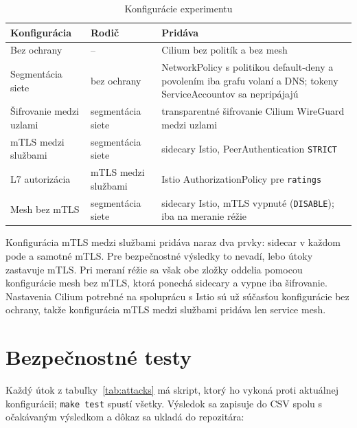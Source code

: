 \begin{table}[ht!]
  \centering
  \caption{Konfigurácie experimentu}
  \label{tab:configurations}
  \footnotesize
  \renewcommand{\arraystretch}{1.15}
  \begin{tabularx}{\textwidth}{@{}>{\raggedright\arraybackslash}p{3.2cm}>{\raggedright\arraybackslash}p{2.6cm}>{\raggedright\arraybackslash}X@{}}
    \toprule
    Konfigurácia & Rodič & Pridáva \\
    \midrule
    Bez ochrany & -- & Cilium bez politík a bez mesh \\
    Segmentácia siete & bez ochrany & NetworkPolicy s politikou default-deny a povolením iba grafu volaní a DNS; tokeny ServiceAccountov sa nepripájajú \\
    Šifrovanie medzi uzlami & segmentácia siete & transparentné šifrovanie Cilium WireGuard medzi uzlami \\
    mTLS medzi službami & segmentácia siete & sidecary Istio, PeerAuthentication \texttt{STRICT} \\
    L7 autorizácia & mTLS medzi službami & Istio AuthorizationPolicy pre \texttt{ratings} \\
    Mesh bez mTLS & segmentácia siete & sidecary Istio, mTLS vypnuté (\texttt{DISABLE}); iba na meranie réžie \\
    \bottomrule
  \end{tabularx}
\end{table}

Konfigurácia mTLS medzi službami pridáva naraz dva prvky: sidecar v každom pode a samotné mTLS. Pre bezpečnostné výsledky to nevadí, lebo útoky zastavuje mTLS. Pri meraní réžie sa však obe zložky oddelia pomocou konfigurácie mesh bez mTLS, ktorá ponechá sidecary a vypne iba šifrovanie. Nastavenia Cilium potrebné na spoluprácu s Istio sú už súčasťou konfigurácie bez ochrany, takže konfigurácia mTLS medzi službami pridáva len service mesh.

\section{Bezpečnostné testy}
\label{sec:attack-tests}

Každý útok z tabuľky~\ref{tab:attacks} má skript, ktorý ho vykoná proti aktuálnej konfigurácii; \texttt{make test} spustí všetky. Výsledok sa zapisuje do CSV spolu s očakávaným výsledkom a dôkaz sa ukladá do repozitára:

